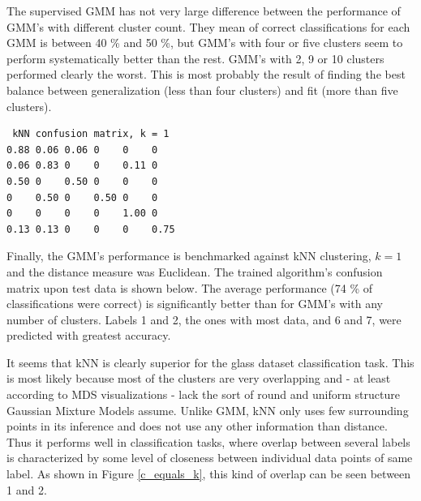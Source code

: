\documentclass[a4paper]{article}
\begin{document}
\par
The supervised GMM has not very large difference between the performance of
GMM's with different cluster count. They mean of correct classifications for
each GMM is between 40 \% and 50 \%, but GMM's with four or five clusters seem
to perform systematically better than the rest. GMM's with 2, 9 or 10 clusters
performed clearly the worst. This is most probably the result of finding the
best balance between generalization (less than four clusters) and fit (more
than five clusters).

\begin{verbatim}
 kNN confusion matrix, k = 1
0.88 0.06 0.06 0    0    0   
0.06 0.83 0    0    0.11 0   
0.50 0    0.50 0    0    0   
0    0.50 0    0.50 0    0   
0    0    0    0    1.00 0   
0.13 0.13 0    0    0    0.75
\end{verbatim}

\par
Finally, the GMM's performance is benchmarked against kNN clustering, $ k = 1 $
and the distance measure was Euclidean. The trained algorithm's confusion
matrix upon test data is shown below. The average performance (74 \% of
classifications were correct) is significantly better than for GMM's with any
number of clusters. Labels 1 and 2, the ones with most data, and 6 and 7,
were predicted with greatest accuracy. 

\par
It seems that kNN is clearly superior for the glass dataset classification task. This is most likely because most of the clusters are very overlapping and - at least according to MDS visualizations - lack the sort of round and uniform structure Gaussian Mixture Models assume. Unlike GMM, kNN only uses few surrounding points in its inference and does not use any other information than distance. Thus it performs well in classification tasks, where overlap between several labels is characterized by some level of closeness between individual data points of same label. As shown in Figure \ref{c_equals_k}, this kind of overlap can be seen between 1 and 2. 


\end{document}
